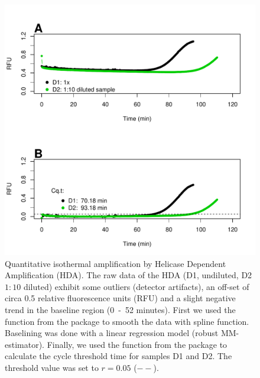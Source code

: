 \begin{figure}[htbp]
  \centering
  \includegraphics[clip=true, width=14cm]{figures/qIA.pdf}
  \caption{Quantitative isothermal amplification by Helicase Dependent 
Amplification (HDA).  The raw data of the HDA (D1, undiluted, D2 
$1:10$ diluted) exhibit some outliers (detector artifacts), an off-set of circa 
0.5 relative fluorescence units (RFU) and a slight negative trend in the 
baseline region (0~-~52 minutes).  First we used the  
function from the  package to smooth the data with spline 
function. Baselining was done with a linear regression model (robust 
MM-estimator). Finally, we used the  function from the 
 package to calculate the cycle threshold time for samples D1 
and D2. The threshold value was set to $r = 0.05$ ($--$).}
  \label{figure:qIA}
\end{figure}

